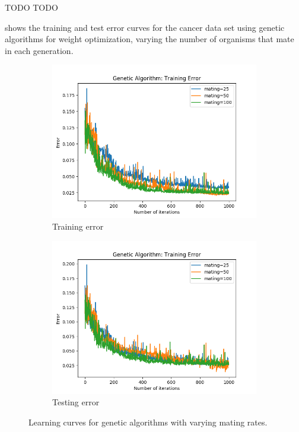 \documentclass{article}
\begin{document}
        TODO TODO

         shows the training and test error curves for the cancer data set using genetic algorithms for weight optimization, varying the number of organisms that mate in each generation.

        \begin{figure}[htb]
        \centering

        \begin{subfigure}{0.5\textwidth}
          \includegraphics[width=\linewidth]{out/ga/mating-training.png}
          \caption{Training error}
          \label{fig:ga-mating-1}
        \end{subfigure}\hfil
        \begin{subfigure}{0.5\textwidth}
          \includegraphics[width=\linewidth]{out/ga/mating-testing.png}
          \caption{Testing error}
          \label{fig:ga-mating-2}
        \end{subfigure}

        \caption{Learning curves for genetic algorithms with varying mating rates.}
        \label{fig:ga-mating}
        \end{figure}
\end{document}
